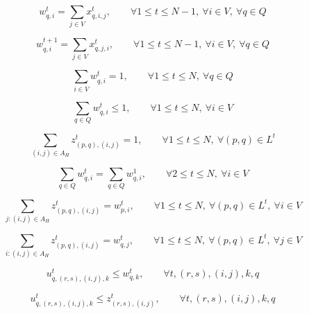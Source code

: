 \documentclass[UTF8,11pt]{ctexart}
\begin{document}
\begin{equation}
w_{q,i}^t = \sum_{j\in V} x_{q,i,j}^t,
\qquad
\forall 1 \le t \le N-1,\ \forall i \in V,\ \forall q \in Q
\tag{1d}
\end{equation}

\begin{equation}
w_{q,i}^{t+1} = \sum_{j\in V} x_{q,j,i}^t,
\qquad
\forall 1 \le t \le N-1,\ \forall i \in V,\ \forall q \in Q
\tag{1e}
\end{equation}

\begin{equation}
\sum_{i\in V} w_{q,i}^t = 1,
\qquad
\forall 1 \le t \le N,\ \forall q \in Q
\tag{1f}
\end{equation}

\begin{equation}
\sum_{q\in Q} w_{q,i}^t \le 1,
\qquad
\forall 1 \le t \le N,\ \forall i \in V
\tag{1g}
\end{equation}

\begin{equation}
\sum_{(i,j)\in A_H} z_{(p,q),(i,j)}^t = 1,
\qquad
\forall 1 \le t \le N,\ \forall (p,q) \in L^t
\tag{1h}
\end{equation}



\begin{equation}
\sum_{q\in Q} w_{q,i}^t = \sum_{q\in Q} w_{q,i}^1,
\qquad
\forall 2 \le t \le N,\ \forall i \in V
\tag{1j}
\end{equation}

\begin{equation}
\sum_{j:(i,j)\in A_H} z_{(p,q),(i,j)}^t = w_{p,i}^t,
\qquad
\forall 1 \le t \le N,\ \forall (p,q) \in L^t,\ \forall i \in V
\tag{2a}
\end{equation}

\begin{equation}
\sum_{i:(i,j)\in A_H} z_{(p,q),(i,j)}^t = w_{q,j}^t,
\qquad
\forall 1 \le t \le N,\ \forall (p,q) \in L^t,\ \forall j \in V
\tag{2b}
\end{equation}

\begin{equation}
u_{q,(r,s),(i,j),k}^t \le w_{q,k}^t,
\qquad
\forall t,(r,s),(i,j),k,q
\tag{2c}
\end{equation}

\begin{equation}
u_{q,(r,s),(i,j),k}^t \le z_{(r,s),(i,j)}^t,
\qquad
\forall t,(r,s),(i,j),k,q
\tag{2d}
\end{equation}
\end{document}
